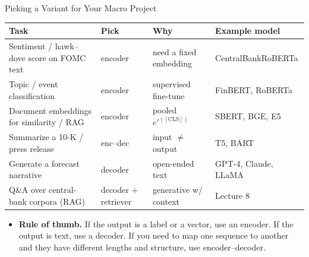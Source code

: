 \begin{frame}{Picking a Variant for Your Macro Project}
\begin{center}
\renewcommand{\arraystretch}{1.3}
\footnotesize
\begin{tabular}{l l l l}
\toprule
\textbf{Task} & \textbf{Pick} & \textbf{Why} & \textbf{Example model} \\
\midrule
Sentiment / hawk--dove score on FOMC text & encoder & need a fixed embedding & CentralBankRoBERTa \\
Topic / event classification              & encoder & supervised fine-tune  & FinBERT, RoBERTa \\
Document embeddings for similarity / RAG  & encoder & pooled $e'^{([\text{CLS}])}$ & SBERT, BGE, E5 \\
Summarize a 10-K / press release          & enc--dec & input $\neq$ output & T5, BART \\
Generate a forecast narrative             & decoder & open-ended text      & GPT-4, Claude, LLaMA \\
Q\&A over central-bank corpora (RAG)      & decoder $+$ retriever & generative w/ context & Lecture 8 \\
\bottomrule
\end{tabular}
\end{center}

\medskip
\begin{itemize}
\item \textbf{Rule of thumb.} If the output is a label or a vector, use an encoder. If the output is text, use a decoder. If you need to map one sequence to another and they have different lengths and structure, use encoder--decoder.
\end{itemize}
\end{frame}

